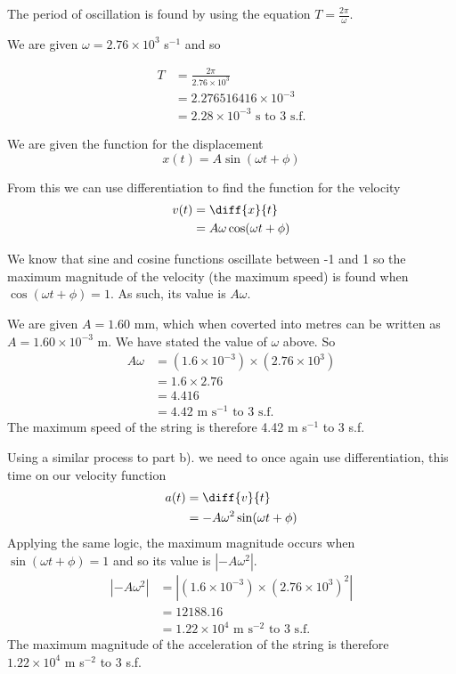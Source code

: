 \documentclass[a4paper,12pt]{article}
\numberwithin{equation}{section}
\begin{document}
\begin{question}

\qpart
The period of oscillation is found by using the equation $T=\frac{2\pi}{\omega}$.

We are given $\omega=2.76 \times 10^3$ s$^{-1}$ and so

\begin{align*}
T &= \frac{2\pi}{2.76 \times 10^3}\\
&= 2.276516416 \times 10^{-3}\\
&= 2.28  \times 10^{-3}\text{ s to 3 s.f.}
\end{align*}

\qpart
We are given the function for the displacement
\[
x(t)=A\sin(\omega t + \phi)
\]

From this we can use differentiation to find the function for the velocity
\begin{align*}
v(t)&=\diff{x}{t}\\
&=A\omega\cos(\omega t + \phi)
\end{align*}

We know that sine and cosine functions oscillate between -1 and 1 so the maximum magnitude of the velocity (the maximum speed) is found when $\cos(\omega t + \phi)=1$. As such, its value is $A\omega$.

We are given $A=1.60$ mm, which when coverted into metres can be written as $A=1.60\times 10^{-3}$ m. We have stated the value of $\omega$ above. So
\begin{align*}
A\omega&=(1.6\times 10^{-3})\times(2.76 \times 10^3)\\
&=1.6\times2.76\\
&=4.416\\
&=4.42 \text{ m s}^{-1}\text{ to 3 s.f.}
\end{align*}
The maximum speed of the string is therefore 4.42 m s$^{-1}$ to 3 s.f.

\newpage

\qpart
Using a similar process to part b). we need to once again use differentiation, this time on our velocity function
\begin{align*}
a(t)&=\diff{v}{t}\\
&=-A\omega^2\sin(\omega t + \phi)
\end{align*}
Applying the same logic, the maximum magnitude occurs when $\sin(\omega t + \phi)=1$ and so its value is $|-A\omega^2|$.
\begin{align*}
|-A\omega^2|&=|(1.6\times 10^{-3})\times(2.76 \times 10^3)^2|\\
&=12188.16\\
&=1.22\times 10^4 \text{ m s}^{-2}\text{ to 3 s.f.}
\end{align*}
The maximum magnitude of the acceleration of the string is therefore \\$1.22 \times 10^4$ m s$^{-2}$ to 3 s.f. 


\end{question}
\end{document}
